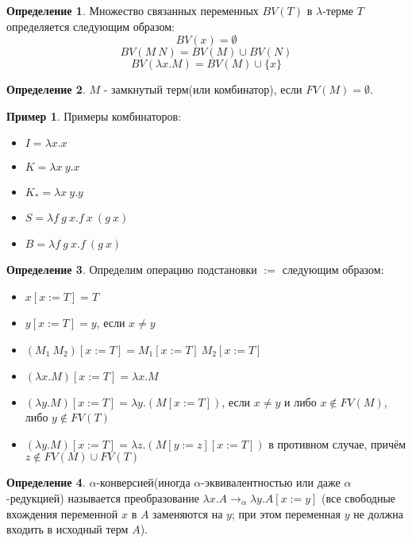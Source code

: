 \documentclass[10pt,twoside]{article}
\theoremstyle{plain}
\theoremstyle{definition}
\newtheorem{defi}{Определение}
\newtheorem*{example}{Пример}
\begin{document}
\begin{defi}
  Множество связанных переменных $BV(T)$ в $\lambda$-терме $T$ определяется следующим образом:
  $$BV(x)=\emptyset$$
  $$BV(M\ N)=BV(M)\cup BV(N)$$
  $$BV(\lambda x.M) = BV(M)\cup \{x\}$$
\end{defi}

\begin{defi}
  $M$ - замкнутый терм(или комбинатор), если $FV(M)=\emptyset$.
\end{defi}

\begin{example} Примеры комбинаторов:
  \begin{itemize}
    \item $I = \lambda x.x$
    \item $K = \lambda x\ y.x$
    \item $K_* = \lambda x\ y.y$
    \item $S = \lambda f\ g\ x.f\ x\ (g\ x)$
    \item $B = \lambda f\ g\ x.f\ (g\ x)$
  \end{itemize}
\end{example}

\begin{defi}
  Определим операцию подстановки $:=$ следующим образом:
  \begin{itemize}
    \item $x[x := T] = T$
    \item $y[x := T] = y$, если $x\neq y$
    \item $(M_1\ M_2)[x := T] = M_1[x := T]\ M_2[x := T]$
    \item $(\lambda x.M)[x := T] = \lambda x.M$
    \item $(\lambda y.M)[x := T] = \lambda y.(M[x:=T])$, если $x\neq y$ и либо $x \notin FV(M)$, либо $y \notin FV(T)$
    \item $(\lambda y.M)[x := T] = \lambda z.(M[y:=z][x:=T])$ в противном случае, причём $z \notin FV(M)\cup FV(T)$
  \end{itemize}
\end{defi}

\begin{defi}
  $\alpha$-конверсией(иногда $\alpha$-эквивалентностью или даже $\alpha$-редукцией) называется преобразование $\lambda x.A \to_\alpha \lambda y.A[x:=y]$ (все свободные вхождения переменной $x$ в $A$ заменяются на $y$; при этом переменная $y$ не должна входить в исходный терм $A$).
\end{defi}
\end{document}
